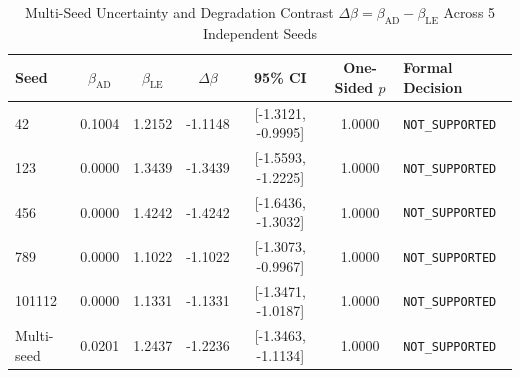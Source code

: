 \begin{table}[htbp]
\centering
\caption{Multi-Seed Uncertainty and Degradation Contrast $\Delta\beta = \beta_{\text{AD}} - \beta_{\text{LE}}$ Across 5 Independent Seeds}
\label{tab:multiseed_results}
\begin{tabular}{lcccccl}
\hline
\textbf{Seed} & $\beta_{\text{AD}}$ & $\beta_{\text{LE}}$ & $\Delta\beta$ & \textbf{95\% CI} & \textbf{One-Sided $p$} & \textbf{Formal Decision} \\
\hline
42 & 0.1004 & 1.2152 & -1.1148 & [-1.3121, -0.9995] & 1.0000 & \texttt{NOT_SUPPORTED} \\
123 & 0.0000 & 1.3439 & -1.3439 & [-1.5593, -1.2225] & 1.0000 & \texttt{NOT_SUPPORTED} \\
456 & 0.0000 & 1.4242 & -1.4242 & [-1.6436, -1.3032] & 1.0000 & \texttt{NOT_SUPPORTED} \\
789 & 0.0000 & 1.1022 & -1.1022 & [-1.3073, -0.9967] & 1.0000 & \texttt{NOT_SUPPORTED} \\
101112 & 0.0000 & 1.1331 & -1.1331 & [-1.3471, -1.0187] & 1.0000 & \texttt{NOT_SUPPORTED} \\
Multi-seed & 0.0201 & 1.2437 & -1.2236 & [-1.3463, -1.1134] & 1.0000 & \texttt{NOT_SUPPORTED} \\
\hline
\end{tabular}
\end{table}
